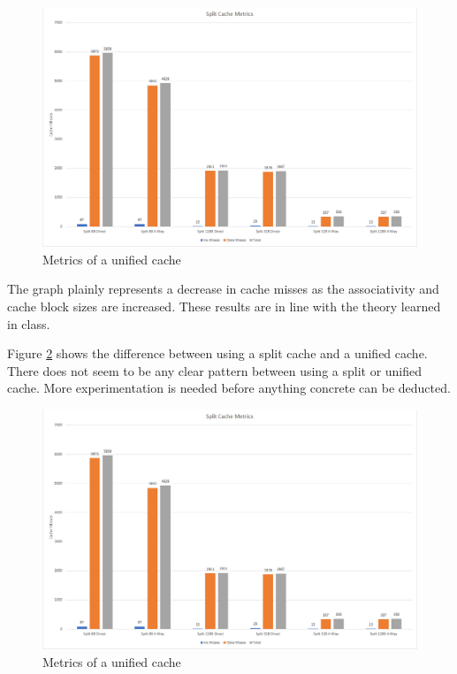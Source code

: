 \documentclass{article}
\begin{document}
        \begin{figure}[H]
            \label{fig:splitMetric}
            \begin{center}
                \includegraphics[width=\textwidth]{spl-cache-metrics.png}
                \caption{Metrics of a unified cache}
            \end{center}
        \end{figure}
        The graph plainly represents a decrease in cache misses as the associativity and cache block sizes are increased. These results are in line with the theory learned in class.
        \par
        Figure \ref{fig:diffMetric} shows the difference between using a split cache and a unified cache. There does not seem to be any clear pattern between using a split or unified cache. More experimentation is needed before anything concrete can be deducted.
        \begin{figure}[H]
            \label{fig:diffMetric}
            \begin{center}
                \includegraphics[width=\textwidth]{spl-cache-metrics.png}
                \caption{Metrics of a unified cache}
            \end{center}
        \end{figure}
\end{document}
